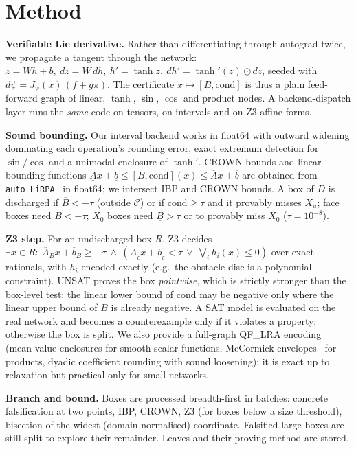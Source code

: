 \documentclass[10pt]{article}
\newcommand{\C}{\mathcal{C}}
\newcommand{\cond}{\mathrm{cond}}
\begin{document}
\section{Method}
\textbf{Verifiable Lie derivative.} Rather than differentiating through autograd twice, we propagate a tangent through the network: $z=Wh+b,\ dz=W\,dh,\ h'=\tanh z,\ dh'=\tanh'(z)\odot dz$, seeded with $d\psi=J_\psi(x)\,(f+g\pi)$. The certificate $x\mapsto[B,\cond]$ is thus a plain feed-forward graph of linear, $\tanh$, $\sin$, $\cos$ and product nodes. A backend-dispatch layer runs the \emph{same} code on tensors, on intervals and on Z3 affine forms.

\textbf{Sound bounding.} Our interval backend works in float64 with outward widening dominating each operation's rounding error, exact extremum detection for $\sin/\cos$ and a unimodal enclosure of $\tanh'$. CROWN bounds and linear bounding functions $\underline A x+\underline b\le[B,\cond](x)\le\overline Ax+\overline b$ are obtained from \texttt{auto\_LiRPA}~\cite{xu2020autolirpa} in float64; we intersect IBP and CROWN bounds. A box of $D$ is discharged if $\overline B<-\tau$ (outside $\C$) or if $\underline{\cond}\ge\tau$ and it provably misses $X_u$; face boxes need $\overline B<-\tau$; $X_0$ boxes need $\underline B>\tau$ or to provably miss $X_0$ ($\tau=10^{-8}$).

\textbf{Z3 step.} For an undischarged box $R$, Z3 decides
$\exists x\in R:\ \overline A_Bx+\overline b_B\ge-\tau\ \wedge\ (\underline A_c x+\underline b_c<\tau\ \vee\ \textstyle\bigvee_i h_i(x)\le 0)$
over exact rationals, with $h_i$ encoded exactly (e.g.\ the obstacle disc is a polynomial constraint). UNSAT proves the box \emph{pointwise}, which is strictly stronger than the box-level test: the linear lower bound of $\cond$ may be negative only where the linear upper bound of $B$ is already negative. A SAT model is evaluated on the real network and becomes a counterexample only if it violates a property; otherwise the box is split. We also provide a full-graph QF\_LRA encoding (mean-value enclosures for smooth scalar functions, McCormick envelopes~\cite{mccormick1976} for products, dyadic coefficient rounding with sound loosening); it is exact up to relaxation but practical only for small networks.

\textbf{Branch and bound.} Boxes are processed breadth-first in batches: concrete falsification at two points, IBP, CROWN, Z3 (for boxes below a size threshold), bisection of the widest (domain-normalised) coordinate. Falsified large boxes are still split to explore their remainder. Leaves and their proving method are stored.
\end{document}
